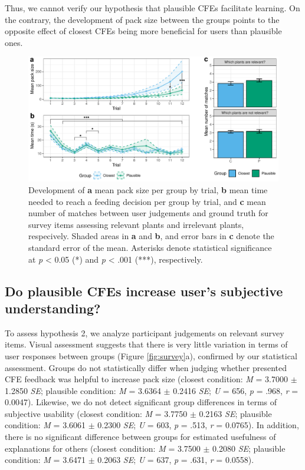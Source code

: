 Thus, we cannot verify our hypothesis that plausible \glspl{CFE} facilitate learning. On the contrary, the development of pack size between the groups points to the opposite effect of closest \glspl{CFE} being more beneficial for users than plausible ones.

\begin{figure}
   \centering
   \includegraphics[width=\textwidth]{./media/H1_p_ShubsPerTrial_RTPertrial_PAZ_FINAL.pdf}
   \caption{Development of \textbf{a} mean pack size per group by trial, \textbf{b} mean time needed to reach a feeding decision per group by trial, and \textbf{c} mean number of matches between user judgements and ground truth for survey items assessing relevant plants and irrelevant plants, respecively. Shaded areas in \textbf{a} and \textbf{b}, and error bars in \textbf{c} denote the standard error of the mean. Asterisks denote statistical significance at \textit{p} < 0.05 (*) and \textit{p} < .001 (***), respectively.}
   \label{fig:hyp1}
 \end{figure}

\subsection{Do plausible CFEs increase user's subjective understanding?}
To assess hypothesis 2, we analyze participant judgements on relevant survey items.
Visual assessment suggests that there is very little variation in terms of user responses between groups (Figure \ref{fig:survey}a), confirmed by our statistical assessment. 
Groups do not statistically differ when judging whether presented \gls{CFE} feedback was helpful to increase pack size (closest condition: \textit{M} = 3.7000 $\pm$ 1.2850 \textit{SE}; plausible condition: \textit{M} = 3.6364 $\pm$ 0.2416 \textit{SE}; \textit{U} = 656, \textit{p} = .968, \textit{r} = 0.0047).
Likewise, we do not detect significant group differences in terms of subjective usability (closest condition: \textit{M} = 3.7750 $\pm$ 0.2163 \textit{SE}; plausible condition: \textit{M} = 3.6061 $\pm$ 0.2300 \textit{SE}; \textit{U} = 603, \textit{p} = .513, \textit{r} = 0.0765).
In addition, there is no significant difference between groups for estimated usefulness of explanations for others (closest condition: \textit{M} = 3.7500 $\pm$ 0.2080 \textit{SE}; plausible condition: \textit{M} = 3.6471 $\pm$ 0.2063 \textit{SE}; \textit{U} = 637, \textit{p} = .631, \textit{r} = 0.0558).

